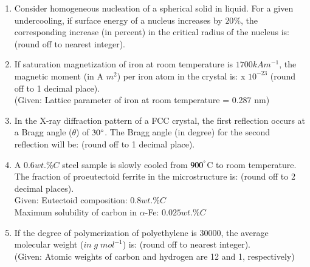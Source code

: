 \documentclass[journal]{IEEEtran}
\theoremstyle{remark}
\begin{document}
\begin{enumerate}
\item Consider homogeneous nucleation of a spherical solid in liquid. For a given undercooling, if surface energy of a nucleus increases by $20 \%$, the corresponding increase (in percent) in the critical radius of the nucleus is: \underline {\hspace{2cm}} (round off to nearest integer). \hfill{}

\item If saturation magnetization of iron at room temperature is $1700 kA m^{-1}$, the magnetic moment (in A $m^2$) per iron atom in the crystal is: \underline {\hspace{2cm}} x $10^{-23}$ (round off to 1 decimal place). \\ (Given: Lattice parameter of iron at room temperature = 0.287 nm) \hfill{}

\item In the X-ray diffraction pattern of a FCC crystal, the first reflection occurs at a Bragg angle ($\theta$) of $30\degree$. The Bragg angle (in degree) for the second reflection will be: \underline {\hspace{2cm}} (round off to 1 decimal place). \hfill{}

\item A $0.6 wt.\% C$ steel sample is slowly cooled from $900 ^\degree$C to room temperature. The fraction of proeutectoid ferrite in the microstructure is: \underline {\hspace{2cm}} (round off to 2 decimal places). \\ Given: Eutectoid composition: $0.8 wt.\% C$ \\ Maximum solubility of carbon in $\alpha$-Fe: $0.025 wt.\% C$ \hfill{}

\item If the degree of polymerization of polyethylene is 30000, the average molecular weight ($in\; g\; mol^{-1}$) is: \underline {\hspace{2cm}} (round off to nearest integer). \\ (Given: Atomic weights of carbon and hydrogen are 12 and 1, respectively) \hfill{}


\end{enumerate}
\end{document}
